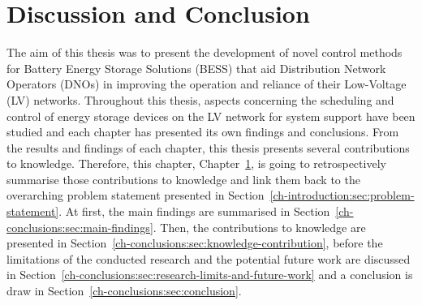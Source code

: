 \chapter{Discussion and Conclusion}
\label{ch-conclusions}

The aim of this thesis was to present the development of novel control methods for Battery Energy Storage Solutions (BESS) that aid Distribution Network Operators (DNOs) in improving the operation and reliance of their Low-Voltage (LV) networks.
Throughout this thesis, aspects concerning the scheduling and control of energy storage devices on the LV network for system support have been studied and each chapter has presented its own findings and conclusions.
From the results and findings of each chapter, this thesis presents several contributions to knowledge.
Therefore, this chapter, Chapter~\ref{ch-conclusions}, is going to retrospectively summarise those contributions to knowledge and link them back to the overarching problem statement presented in Section~\ref{ch-introduction:sec:problem-statement}.
At first, the main findings are summarised in Section~\ref{ch-conclusions:sec:main-findings}.
Then, the contributions to knowledge are presented in Section~\ref{ch-conclusions:sec:knowledge-contribution}, before the limitations of the conducted research and the potential future work are discussed in Section~\ref{ch-conclusions:sec:research-limits-and-future-work} and a conclusion is draw in Section~\ref{ch-conclusions:sec:conclusion}.









